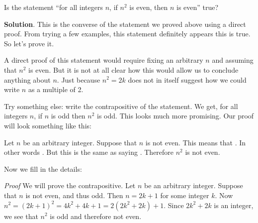 \documentclass[11pt,]{book}
\makeatletter
\theoremstyle{ptxplainnotitle}
\theoremstyle{ptxplaintitle}
\renewcommand*{\proofname}{Proof}
\renewenvironment{proof}[1][\proofname]{\par
  \pushQED{\qed}%
  \normalfont \topsep6\p@\@plus6\p@\relax
  \trivlist
  \item\relax
    {\itshape
    #1\@addpunct{.}}\hspace\labelsep\ignorespaces
}{%
  \popQED\endtrivlist\@endpefalse
}
\theoremstyle{ptxdefinitionnotitle}
\theoremstyle{ptxdefinitiontitle}
\theoremstyle{ptxdefinitionnotitle}
\theoremstyle{ptxdefinitiontitle}
\theoremstyle{ptxdefinitionnotitle}
\theoremstyle{ptxdefinitiontitle}
\theoremstyle{ptxdefinitiontitlenonumber}
\theoremstyle{ptxdefinitiontitlenonumber}
\numberwithin{equation}{chapter}
\makeatother
\begin{document}
\begin{example}\label{example-65}
\hypertarget{p-2406}{}%
Is the statement ``for all integers \(n\), if \(n^2\) is even, then \(n\) is even'' true?%
\par\smallskip%
\noindent\textbf{Solution}.\hypertarget{solution-248}{}\quad%
\hypertarget{p-2407}{}%
This is the converse of the statement we proved above using a direct proof. From trying a few examples, this statement definitely appears this is true. So let's prove it.%
\par
\hypertarget{p-2408}{}%
A direct proof of this statement would require fixing an arbitrary \(n\) and assuming that \(n^2\) is even. But it is not at all clear how this would allow us to conclude anything about \(n\). Just because \(n^2 = 2k\) does not in itself suggest how we could write \(n\) as a multiple of 2.%
\par
\hypertarget{p-2409}{}%
Try something else: write the contrapositive of the statement. We get, for all integers \(n\), if \(n\) is odd then \(n^2\) is odd. This looks much more promising. Our proof will look something like this:%
\par
\hypertarget{p-2410}{}%
Let \(n\) be an arbitrary integer. Suppose that \(n\) is not even. This means that \textellipsis{}. In other words \textellipsis{}. But this is the same as saying \textellipsis{}. Therefore \(n^2\) is not even.%
\par
\hypertarget{p-2411}{}%
Now we fill in the details:%
\begin{proof}\hypertarget{proof-24}{}
\hypertarget{p-2412}{}%
We will prove the contrapositive. Let \(n\) be an arbitrary integer. Suppose that \(n\) is not even, and thus odd. Then \(n= 2k+1\) for some integer \(k\). Now \(n^2 = (2k+1)^2 = 4k^2 + 4k + 1 = 2(2k^2 + 2k) + 1\). Since \(2k^2 + 2k\) is an integer, we see that \(n^2\) is odd and therefore not even.%
\end{proof}
\end{example}
\end{document}
